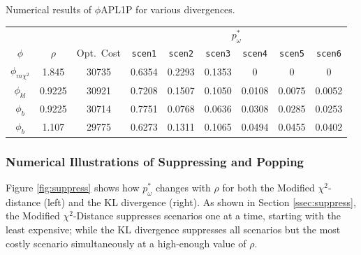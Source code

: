 \documentclass[opre,nonblindrev]{informs3} %
\begin{document}
\begin{table}
	\TABLE
	{
		Numerical results of $\phi$APL1P for various divergences.
		\label{tb:numerical_results}
	}
	{\begin{tabular}{ccccccccc}
		\hline
		       &  		  & 				 & \multicolumn{6}{c}{$p_{\omega}^*$} \\
		\cline{4-9}
		$\phi$ & $\rho$  & Opt.\ Cost  & \texttt{scen1} & \texttt{scen2} & \texttt{scen3} & \texttt{scen4} & \texttt{scen5} & \texttt{scen6} \\
 		\hline
		$\phi_{m\chi^2}$ &  1.845  & 30735 &  0.6354 & 0.2293 & 0.1353 & 0      & 0      & 0 \\
		$\phi_{kl}$      &  0.9225 & 30921 &  0.7208 & 0.1507 & 0.1050 & 0.0108 & 0.0075 & 0.0052 \\
		$\phi_b$         &  0.9225 & 30714 & 0.7751 & 0.0768 & 0.0636 & 0.0308 & 0.0285 & 0.0253 \\
		\hline
		$\phi_b$         &  1.107  & 29775 & 0.6273 & 0.1311 & 0.1065  & 0.0494 & 0.0455 & 0.0402 \\
		\hline
	\end{tabular}}
	{}
\end{table}

\subsubsection{Numerical Illustrations of Suppressing and Popping}
\label{ssec:numerical_pop_suppress}





Figure \ref{fig:suppress} shows how $p^*_\omega$ changes with $\rho$ for both the Modified $\chi^2$-distance (left) and the KL divergence (right).
As shown in Section \ref{ssec:suppress}, the Modified $\chi^2$-Distance suppresses scenarios one at a time, starting with the least expensive; while the KL divergence suppresses all scenarios but the most costly scenario simultaneously at a high-enough value of $\rho$.
\end{document}
